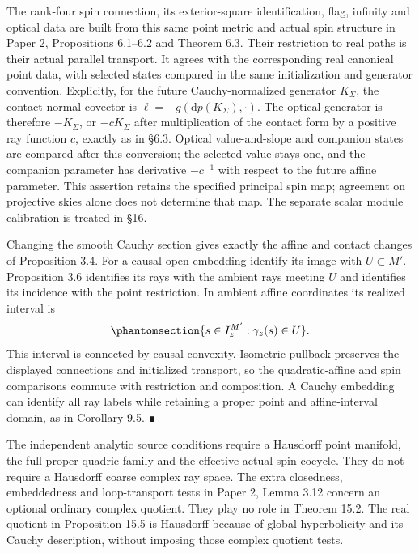 \documentclass[
  english,
  11pt,
  reqno]{amsart}
\begin{document}
The rank-four spin connection, its exterior-square identification, flag,
infinity and optical data are built from this same point metric and
actual spin structure in Paper 2, Propositions 6.1--6.2 and Theorem 6.3.
Their restriction to real paths is their actual parallel transport. It
agrees with the corresponding real canonical point data, with selected
states compared in the same initialization and generator convention.
Explicitly, for the future Cauchy-normalized generator \(K_\Sigma\), the
contact-normal covector is \(\ell=-g(\mathrm dp(K_\Sigma),\cdot)\). The
optical generator is therefore \(-K_\Sigma\), or \(-cK_\Sigma\) after
multiplication of the contact form by a positive ray function \(c\),
exactly as in §6.3. Optical value-and-slope and companion states are
compared after this conversion; the selected value stays one, and the
companion parameter has derivative \(-c^{-1}\) with respect to the
future affine parameter. This assertion retains the specified principal
spin map; agreement on projective skies alone does not determine that
map. The separate scalar module calibration is treated in §16.

Changing the smooth Cauchy section gives exactly the affine and contact
changes of Proposition 3.4. For a causal open embedding identify its
image with \(U\subset M'\). Proposition 3.6 identifies its rays with the
ambient rays meeting \(U\) and identifies its incidence with the point
restriction. In ambient affine coordinates its realized interval is
\begin{equation}\protect\phantomsection\label{eq:analytic-real-restricted-affine-interval}{
\{s\in I_z^{M'}:\gamma_z(s)\in U\}.
}\end{equation} This interval is connected by causal convexity.
Isometric pullback preserves the displayed connections and initialized
transport, so the quadratic-affine and spin comparisons commute with
restriction and composition. A Cauchy embedding can identify all ray
labels while retaining a proper point and affine-interval domain, as in
Corollary 9.5. ∎

The independent analytic source conditions require a Hausdorff point
manifold, the full proper quadric family and the effective actual spin
cocycle. They do not require a Hausdorff coarse complex ray space. The
extra closedness, embeddedness and loop-transport tests in Paper 2,
Lemma 3.12 concern an optional ordinary complex quotient. They play no
role in Theorem 15.2. The real quotient in Proposition 15.5 is Hausdorff
because of global hyperbolicity and its Cauchy description, without
imposing those complex quotient tests.
\end{document}
